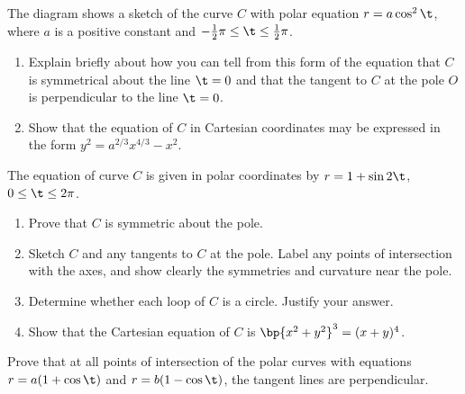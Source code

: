 \begin{problem}
    The diagram shows a sketch of the curve $C$ with polar equation $r = a\cos^2 \t$, where $a$ is a positive constant and $-\frac12 \pi \leq \t \leq \frac12 \pi$.

    \begin{center}
    \end{center}

    \begin{enumerate}
        \item Explain briefly about how you can tell from this form of the equation that $C$ is symmetrical about the line $\t = 0$ and that the tangent to $C$ at the pole $O$ is perpendicular to the line $\t = 0$.
        \item Show that the equation of $C$ in Cartesian coordinates may be expressed in the form $y^2 = a^{2/3} x^{4/3} - x^2$.
    \end{enumerate}
\end{problem}

\begin{problem}
    The equation of curve $C$ is given in polar coordinates by $r = 1 + \sin 2\t$, $0 \leq \t \leq 2\pi$. 
    \begin{enumerate}
        \item Prove that $C$ is symmetric about the pole.
        \item Sketch $C$ and any tangents to $C$ at the pole. Label any points of intersection with the axes, and show clearly the symmetries and curvature near the pole.
        \item Determine whether each loop of $C$ is a circle. Justify your answer.
        \item Show that the Cartesian equation of $C$ is $\bp{x^2 + y^2}^3 = (x+y)^4$.
    \end{enumerate}
\end{problem}

\begin{problem}[C]
    Prove that at all points of intersection of the polar curves with equations $r = a(1 + \cos \t)$ and $r = b(1 - \cos\t)$, the tangent lines are perpendicular.
\end{problem}